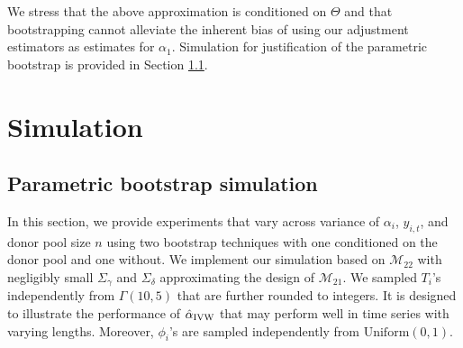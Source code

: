 \documentclass[11pt]{article}
\def\mrm#1{\mathrm{#1}} %
\def\mc#1{\mathcal{#1}} %
\def\E#1{\mathrm{E}(#1)} %
\theoremstyle{definition}
\begin{document}

We stress that the above approximation is conditioned on $\Theta$ and that bootstrapping cannot alleviate the inherent bias of using our adjustment estimators as estimates for $\alpha_1$. %
Simulation for justification of the parametric bootstrap is provided in Section \ref{parametricbootstrapsimulation}.


\section{Simulation}

\label{simulation}


\subsection{Parametric bootstrap simulation}
\label{parametricbootstrapsimulation}

In this section, we provide experiments that vary across variance of $\alpha_i$, $y_{i,t}$, and donor pool size $n$ using two bootstrap techniques with one conditioned on the donor pool and one without. We implement our simulation based on $\mc{M}_{22}$ with negligibly small $\Sigma_{\gamma}$ and $\Sigma_{\delta}$ approximating the design of $\mathcal{M}_{21}$. We  sampled $T_i$'s  independently from  $\Gamma(10, 5)$ that are further rounded to integers. It is designed to illustrate the performance of $\hat{\alpha}_{\rm IVW}$ that may perform well in time series with varying lengths. Moreover, $\phi_i$'s are sampled independently from $\mrm{Uniform}(0,1)$.

\end{document}
